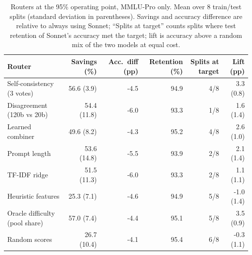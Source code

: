 \begin{table}[!htbp]
\centering\small
\caption{Routers at the 95\% operating point, MMLU-Pro only. Mean over 8 train/test splits (standard deviation in parentheses). Savings and accuracy difference are relative to always using Sonnet; ``Splits at target'' counts splits where test retention of Sonnet's accuracy met the target; lift is accuracy above a random mix of the two models at equal cost.}\label{tab:95_mmlu}
\begin{tabular}{lrrrrr}
\toprule
Router & Savings (\%) & Acc.\ diff (pp) & Retention (\%) & Splits at target & Lift (pp) \\
\midrule
Self-consistency (3 votes) & 56.6 (3.9) & -4.5 & 94.9 & 4/8 & 3.3 (0.8) \\
Disagreement (120b vs 20b) & 54.4 (11.8) & -6.0 & 93.3 & 1/8 & 1.6 (1.4) \\
Learned combiner & 49.6 (8.2) & -4.3 & 95.2 & 4/8 & 2.6 (1.0) \\
Prompt length & 53.6 (14.8) & -5.5 & 93.9 & 2/8 & 2.1 (1.4) \\
TF-IDF ridge & 51.5 (11.3) & -6.0 & 93.3 & 2/8 & 1.1 (1.1) \\
Heuristic features & 25.3 (7.1) & -4.6 & 94.9 & 5/8 & -1.0 (1.4) \\
Oracle difficulty (pool share) & 57.0 (7.4) & -4.4 & 95.1 & 5/8 & 3.5 (0.9) \\
Random scores & 26.7 (10.4) & -4.1 & 95.4 & 6/8 & -0.3 (1.1) \\
\bottomrule
\end{tabular}
\end{table}
